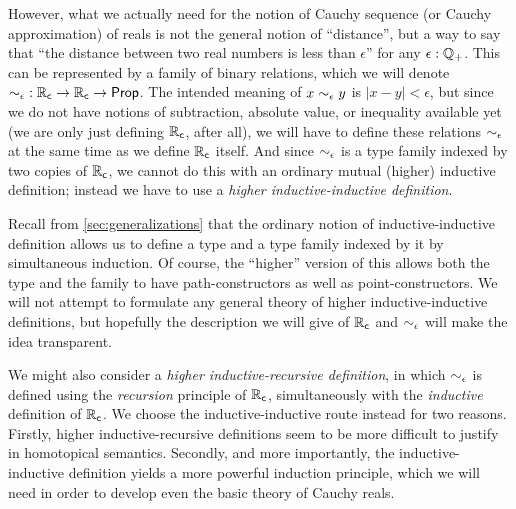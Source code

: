 However, what we actually need for the notion of Cauchy sequence (or Cauchy approximation) of reals is not the general notion of ``distance'', but a way to say that ``the distance between two real numbers is less than $\epsilon$'' for any $\epsilon:\mathbb{Q}_{+}$.
This can be represented by a family of binary relations, which we will denote $\mathord{\sim_{\epsilon}} : \mathbb{R}_\mathsf{c}\to\mathbb{R}_\mathsf{c}\to \mathsf{Prop}$.
The intended meaning of $x \sim_{\epsilon} y$ is $|x - y| < \epsilon$, but since we do not have notions of subtraction, absolute value, or inequality available yet (we are only just defining $\mathbb{R}_\mathsf{c}$, after all), we will have to define these relations $\sim_{\epsilon}$ at the same time as we define $\mathbb{R}_\mathsf{c}$ itself.
And since $\sim_{\epsilon}$ is a type family indexed by two copies of $\mathbb{R}_\mathsf{c}$, we cannot do this with an ordinary mutual (higher) inductive definition; instead we have to use a \emph{higher inductive-inductive definition}.

Recall from \autoref{sec:generalizations} that the ordinary notion of inductive-inductive definition allows us to define a type and a type family indexed by it by simultaneous induction.
Of course, the ``higher'' version of this allows both the type and the family to have path-constructors as well as point-constructors.
We will not attempt to formulate any general theory of higher inductive-inductive definitions, but hopefully the description we will give of $\mathbb{R}_\mathsf{c}$ and $\sim_{\epsilon}$ will make the idea transparent.

\begin{rmk}
  We might also consider a \emph{higher inductive-recursive definition}, in which $\sim_{\epsilon}$ is defined using the \emph{recursion} principle of $\mathbb{R}_\mathsf{c}$, simultaneously with the \emph{inductive} definition of $\mathbb{R}_\mathsf{c}$.
  We choose the inductive-inductive route instead for two reasons.
  Firstly, higher inductive-recursive definitions seem to be more difficult to justify in homotopical semantics.
  Secondly, and more importantly, the inductive-inductive definition yields a more powerful induction principle, which we will need in order to develop even the basic theory of Cauchy reals.
\end{rmk}

